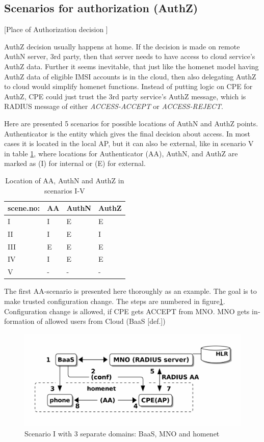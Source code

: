 \documentclass[12pt,a4paper,english]{tutthesis}
\begin{document}
\begin{otherlanguage}{english}
\section{Scenarios for authorization (AuthZ)}
\label{sec-4-5}

[Place of Authorization decision  ]

AuthZ decision usually happens at home.
If the decision is made on remote AuthN server, 3rd party, 
then that server needs to have access to cloud service's AuthZ data. 
Further it seems inevitable, that just like the homenet model
having AuthZ data of eligible IMSI accounts  is in the cloud, 
then also delegating AuthZ to cloud would simplify homenet
functions. Instead of putting logic on CPE for AuthZ, CPE
could just trust the 3rd party service's AuthZ message, which is 
RADIUS message of either \emph{ACCESS-ACCEPT} or \emph{ACCESS-REJECT}.


Here are presented 5 scenarios for possible locations of AuthN and 
AuthZ points. Authenticator is the entity which gives the final decision 
about access. In most cases it is located in the
local AP, but it can also be external, like in scenario V in 
table \ref{table-scenarios}, where locations for Authenticator (AA),
AuthN, and AuthZ are marked as (I) for internal or (E) for external.

\begin{table}[htb]
\caption{\label{table-scenarios}Location of AA, AuthN and AuthZ in scenarios I-V}
\centering
\begin{tabular}{llll}
scene.no: & AA & AuthN & AuthZ\\
\hline
I & I & E & E\\
II & I & E & I\\
III & E & E & E\\
IV & I & E & E\footnotemark\\
V & - & - & -\\
\end{tabular}
\end{table}

\label{scenario-i}
The first AA-scenario is presented here thoroughly as an example.
The goal is to make trusted configuration change. 
The steps are numbered in figure\ref{fig:scenario-I}.
Configuration change is allowed, if CPE gets ACCEPT from MNO.  MNO gets
information of allowed users from Cloud (BaaS [def.])


\begin{figure}[htb]
\centering
\includegraphics[width=.9\linewidth]{scenI.png}
\caption{\label{fig:scenario-I}Scenario I with 3 separate domains: BaaS, MNO and homenet}
\end{figure}



\end{otherlanguage}
\end{document}
